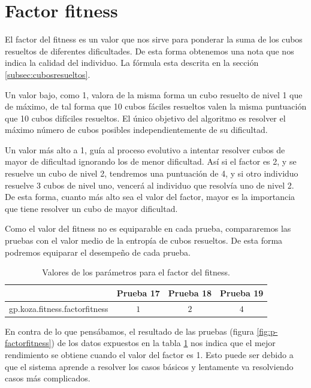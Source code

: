 \section{Factor fitness}\label{sec:p-factor-fitness}	

El factor del fitness es un valor que nos sirve para ponderar la suma de los
cubos resueltos de diferentes dificultades. De esta forma obtenemos una nota que
nos indica la calidad del individuo. La fórmula esta descrita en la sección
\ref{subsec:cubosresueltos}.

Un valor bajo, como 1, valora de la misma forma un cubo resuelto de nivel 1 que
de máximo, de tal forma que 10 cubos fáciles resueltos valen la misma puntuación
que 10 cubos difíciles resueltos. El único objetivo del algoritmo es resolver el
máximo número de cubos posibles independientemente de su dificultad.

Un valor más alto a 1, guía al proceso evolutivo a intentar resolver cubos de
mayor de dificultad ignorando los de menor dificultad. Así si el factor es 2, y
se resuelve un cubo de nivel 2, tendremos una puntuación de 4, y si otro
individuo resuelve 3 cubos de nivel uno, vencerá al individuo que resolvía uno de
nivel 2. De esta forma, cuanto más alto sea el valor del factor, mayor es la
importancia que tiene resolver un cubo de mayor dificultad.

Como el valor del fitness no es equiparable en cada prueba, compararemos las
pruebas con el valor medio de la entropía de cubos resueltos. De esta forma
podremos equiparar el desempeño de cada prueba.

\begin{table}[tb]
\caption{Valores de los parámetros para el factor del fitness.}
\label{tab:factor-fitness}
\centering
\begin{tabular}{lccc}
\toprule
  &\textbf{Prueba 17} & \textbf{Prueba 18} & \textbf{Prueba 19}\\
\midrule
gp.koza.fitness.factorfitness & $1$ & $2$ & $4$   \\
\bottomrule
\end{tabular}
\end{table}

En contra de lo que pensábamos, el resultado de las pruebas (figura
\ref{fig:p-factorfitness}) de los datos expuestos en la tabla
\ref{tab:factor-fitness} nos indica que el mejor rendimiento se obtiene cuando el
valor del factor es 1. Esto puede ser debido a que el sistema aprende a resolver
los casos básicos y lentamente va resolviendo casos más complicados.

